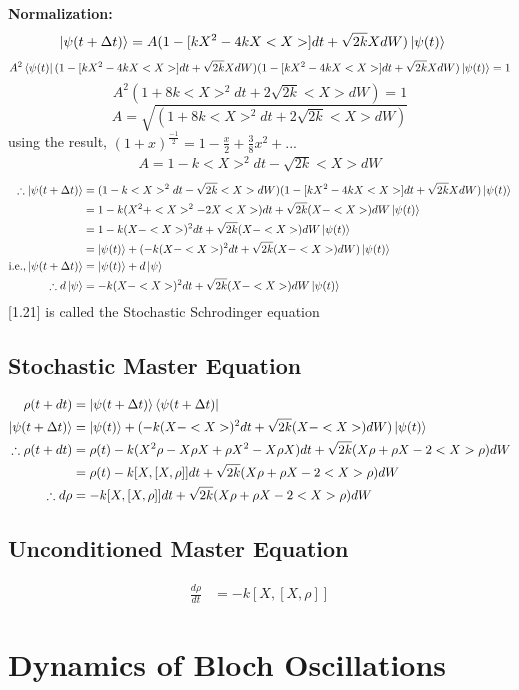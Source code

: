 \documentclass{homeworg}
\begin{document}
\textbf{Normalization:}
\begin{align}
\ket{\psi (t + \Delta t)} &= A ({1-[kX^2 - 4kX<X>]dt +\sqrt{2k}XdW})\ket{\psi (t)}
\end{align}
\begin{equation}
A^2 \bra{\psi(t)}({1-[kX^2 - 4kX<X>]dt +\sqrt{2k}XdW})({1-[kX^2 - 4kX<X>]dt +\sqrt{2k}XdW})\ket{\psi (t)} = 1 
\end{equation}
\begin{equation}
A^2 (1+8k<X>^2dt+2\sqrt{2k}<X>dW)=1 
\end{equation}
\begin{equation}
A = \sqrt{(1+8k<X>^2dt+2\sqrt{2k}<X>dW)}
\end{equation}
using the result, $(1+x)^\frac{-1}{2} = 1 - \frac{x}{2} +\frac{3}{8} x^2 + ...$
\begin{eqnarray}
A = 1 - k<X>^2 dt -\sqrt{2k}<X>dW
\end{eqnarray}
\begin{align}
\therefore \ket{\psi (t + \Delta t)} &= (1 - k<X>^2 dt -\sqrt{2k}<X>dW) ({1-[kX^2 - 4kX<X>]dt +\sqrt{2k}XdW})\ket{\psi (t)}\\
&=1 - k(X^2+<X>^2-2X<X>)dt+\sqrt{2k}(X-<X>)dW \ket{\psi (t)}\\
&=1 - k(X-<X>)^2 dt +\sqrt{2k}(X-<X>)dW \ket{\psi (t)}\\
&=\ket{\psi (t)} + (- k(X-<X>)^2 dt +\sqrt{2k}(X-<X>)dW) \ket{\psi (t)}\\
\text{i.e.,} \ket{\psi (t + \Delta t)} &= \ket{\psi (t)} + d\ket{\psi}\\
\therefore d\ket{\psi} &= - k(X-<X>)^2 dt +\sqrt{2k}(X-<X>)dW \ket{\psi (t)}
\end{align}
 [1.21] is called the Stochastic Schrodinger equation
 \subsection{Stochastic Master Equation}
 \begin{align}
 \rho (t+dt) &= \ket{\psi (t + \Delta t)}\bra{\psi (t + \Delta t)}\\
 \ket{\psi (t + \Delta t)}&=\ket{\psi (t)} + (- k(X-<X>)^2 dt +\sqrt{2k}(X-<X>)dW) \ket{\psi (t)}\\
 \therefore \rho (t+dt)&= \rho(t) -k(X^2\rho -X\rho X +\rho X^2 -X\rho X)dt + \sqrt{2k}(X\rho + \rho X -2<X>\rho)dW\\
 &=\rho(t) - k [X,[X, \rho]]dt + \sqrt{2k}(X\rho+\rho X -2<X>\rho)dW\\
 \therefore d\rho &= - k [X,[X, \rho]]dt + \sqrt{2k}(X\rho+\rho X -2<X>\rho)dW
 \end{align}
 \subsection{Unconditioned Master Equation}
 \begin{align}
 \frac{d\rho}{d t}&=-k[X,[X, \rho]]
 \end{align}
 

\section{Dynamics of Bloch Oscillations}








	
\end{document}
